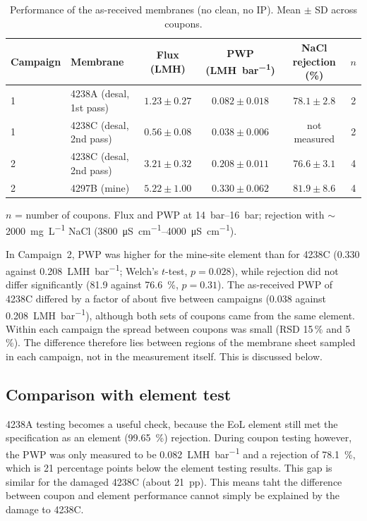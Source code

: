   \begin{table}[htbp]
  \centering
  \caption{Performance of the as-received membranes (no clean, no IP). Mean $\pm$ SD across coupons.}
  \label{tab:baseline}
    \begin{tabular}{llcccc}
    \toprule
    Campaign & Membrane & Flux (\unit{LMH}) & PWP (\unit{LMH.bar^{-1}}) & NaCl rejection (\%) & $n$ \\
    \midrule
    1 & 4238A (desal, 1st pass) & $1.23 \pm 0.27$ & $0.082 \pm 0.018$ & $78.1 \pm 2.8$ & 2 \\
    1 & 4238C (desal, 2nd pass) & $0.56 \pm 0.08$ & $0.038 \pm 0.006$ & not measured & 2 \\
    2 & 4238C (desal, 2nd pass) & $3.21 \pm 0.32$ & $0.208 \pm 0.011$ & $76.6 \pm 3.1$ & 4 \\
    2 & 4297B (mine)            & $5.22 \pm 1.00$ & $0.330 \pm 0.062$ & $81.9 \pm 8.6$ & 4 \\
    \bottomrule
  \end{tabular}
  \par\smallskip
  \footnotesize $n$ = number of coupons. Flux and PWP at \qtyrange{14}{16}{bar}; rejection with $\sim$\qty{2000}{mg.L^{-1}} NaCl (\qtyrange{3800}{4000}{\micro S.cm^{-1}}).
  \end{table}

In Campaign~2, PWP was higher for the mine-site element than for 4238C (0.330 against \qty{0.208}{LMH.bar^{-1}}; Welch's $t$-test, $p = 0.028$), while rejection did not differ significantly (81.9 against \qty{76.6}{\percent}, $p = 0.31$). The as-received PWP of 4238C differed by a factor of about five between campaigns (0.038 against \qty{0.208}{LMH.bar^{-1}}), although both sets of coupons came from the same element. Within each campaign the spread between coupons was small (RSD 15\,\% and 5\,\%). The difference therefore lies between regions of the membrane sheet sampled in each campaign, not in the measurement itself. This is discussed below.

\subsection{Comparison with element test}
4238A testing becomes a useful check, because the EoL element still met the specification as an element (\qty{99.65}{\percent}) rejection. During coupon testing however, the  PWP was only measured to be \qty{0.082}{LMH.bar^{-1}} and a rejection of \qty{78.1}{\percent}, which is 21 percentage points below the element testing results. This gap is similar for the damaged 4238C (about 21~pp). This means taht the difference between coupon and element performance cannot simply be explained by the damage to 4238C. 

